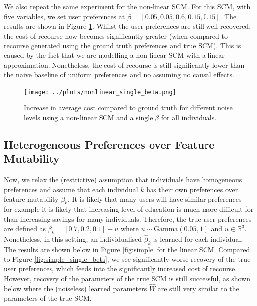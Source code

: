 We also repeat the same experiment for the non-linear SCM. For this SCM, with five variables, we set user preferences at $\beta = [0.05, 0.05, 0.6, 0.15, 0.15]$. The results are shown in Figure \ref{fig:nonlinear_single_beta}. Whilst the user preferences are still well recovered, the cost of recourse now becomes significantly greater (when compared to recourse generated using the ground truth preferences and true SCM). This is caused by the fact that we are modelling a non-linear SCM with a linear approximation. Nonetheless, the cost of recourse is still significantly lower than the naive baseline of uniform preferences and no assuming no causal effects.

\begin{figure}[!htb]
	\centering
	\texttt{[image: ../plots/nonlinear\_single\_beta.png]}
	\caption{Increase in average cost compared to ground truth for different noise levels using a non-linear SCM and a single $\beta$ for all individuals.}
	\label{fig:nonlinear_single_beta}
\end{figure}

\subsection{Heterogeneous Preferences over Feature Mutability}

Now, we relax the (restrictive) assumption that individuals have homogeneous preferences and assume that each individual $k$ has their own preferences over feature mutability $\beta_k$. It is likely that many users will have similar preferences - for example it is likely that increasing level of education is much more difficult for than increasing savings for many individuals. Therefore, the true user preferences are defined as $\beta_k = [0.7, 0.2, 0.1] + u$ where $u \sim \text{Gamma}(0.05, 1)$ and $u \in \mathbb{R}^3$. Nonetheless, in this setting, an individualised $\hat{\beta}_k$ is learned for each individual.\\

The results are shown below in Figure \ref{fig:simple} for the linear SCM. Compared to Figure \ref{fig:simple_single_beta}, we see significantly worse recovery of the true user preferences, which feeds into the significantly increased cost of recourse. However, recovery of the parameters of the true SCM is still successful, as shown below where the (noiseless) learned parameters $\hat{W}$ are still very similar to the parameters of the true SCM.

